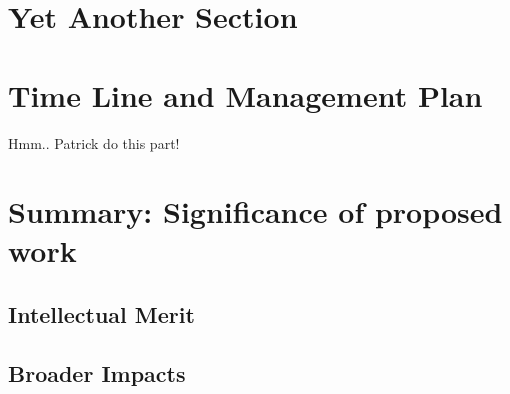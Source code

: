 \documentclass{proposalnsf}
\begin{document}
\section{Yet Another Section}

\section{Time Line and Management Plan}

Hmm.. Patrick do this part!

\section{Summary:  Significance of proposed work}

\subsection{Intellectual Merit}

\subsection{Broader Impacts}



\newpage
{}
\renewcommand{\thepage} {E--\arabic{page}}




\newpage
{}
\renewcommand{\thepage} {G--\arabic{page}}
\end{document}
